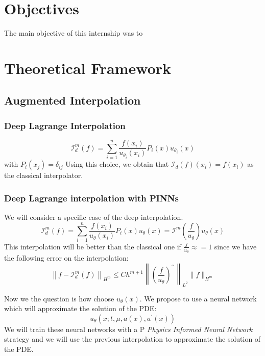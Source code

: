 \documentclass{article}
\begin{document}
\section{Objectives}
The main objective of this internship was to 


\section{Theoretical Framework}


\subsection{Augmented Interpolation}

\subsubsection{Deep Lagrange Interpolation}

\begin{equation*}

    \mathcal{I}_d^m(f)=\sum_{i=1}^n \frac{f\left(x_i\right)}{u_{\theta_i}\left(x_i\right)} P_i(x) u_{\theta_i}(x)
\end{equation*}
with $P_i\left(x_j\right)=\delta_{i j}$
Using this choice, we obtain that $\mathcal{I}_d(f)\left(x_i\right)=f\left(x_i\right)$ as the classical interpolator.

\subsubsection{Deep Lagrange interpolation with PINNs}

We will consider a specific case of the deep interpolation.
$$
\mathcal{I}_d^m(f)=\sum_{i=1}^n \frac{f\left(x_i\right)}{u_\theta\left(x_i\right)} P_i(x) u_\theta(x)=\mathcal{I}^m\left(\frac{f}{u_\theta}\right) u_\theta(x)
$$
This interpolation will be better than the classical one if $\frac{f}{u_\theta} \approx=1$ since we have the following error on the interpolation:
$$
\left\|f-\mathcal{I}_d^m(f)\right\|_{H^m} \leq C h^{m+1}\left\|\left(\frac{f}{u_\theta}\right)^{\prime \prime}\right\|_{L^2}\|f\|_{H^m}
$$

Now we the question is how choose $u_\theta(x)$. We propose to use a neural network which will approximate the solution of the PDE:
$$
u_\theta\left(x ; t, \mu, a(x), a^{\prime}(x)\right)
$$
We will train these neural networks with a P \textit{Physics Informed Neural Network} strategy and we will use the previous interpolation to approximate the solution of the PDE.
\end{document}

